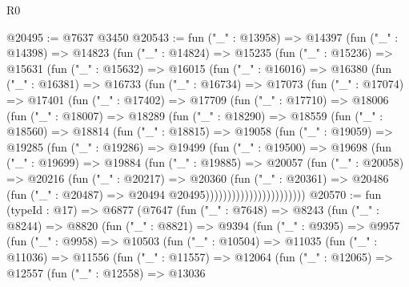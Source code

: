 \begin{lexlean}{R0}
\begin{coremodule}
@20495 := @7637 @3450
@20543 := fun ("_" : @13958) =>
  @14397
    (fun ("_" : @14398) =>
    @14823
      (fun ("_" : @14824) =>
      @15235
        (fun ("_" : @15236) =>
        @15631
          (fun ("_" : @15632) =>
          @16015
            (fun ("_" : @16016) =>
            @16380
              (fun ("_" : @16381) =>
              @16733
                (fun ("_" : @16734) =>
                @17073
                  (fun ("_" : @17074) =>
                  @17401
                    (fun ("_" : @17402) =>
                    @17709
                      (fun ("_" : @17710) =>
                      @18006
                        (fun ("_" : @18007) =>
                        @18289
                          (fun ("_" : @18290) =>
                          @18559
                            (fun ("_" : @18560) =>
                            @18814
                              (fun ("_" : @18815) =>
                              @19058
                                (fun ("_" : @19059) =>
                                @19285
                                  (fun ("_" : @19286) =>
                                  @19499
                                    (fun ("_" : @19500) =>
                                    @19698
                                      (fun ("_" : @19699) =>
                                      @19884
                                        (fun ("_" : @19885) =>
                                        @20057
                                          (fun ("_" : @20058) =>
                                          @20216
                                            (fun ("_" : @20217) =>
                                            @20360
                                              (fun ("_" : @20361) =>
                                              @20486
                                                (fun ("_" : @20487) =>
                                                @20494 @20495)))))))))))))))))))))))
@20570 := fun (typeId : @17) =>
  @6877
    (@7647
      (fun ("_" : @7648) =>
      @8243
        (fun ("_" : @8244) =>
        @8820
          (fun ("_" : @8821) =>
          @9394
            (fun ("_" : @9395) =>
            @9957
              (fun ("_" : @9958) =>
              @10503
                (fun ("_" : @10504) =>
                @11035
                  (fun ("_" : @11036) =>
                  @11556
                    (fun ("_" : @11557) =>
                    @12064
                      (fun ("_" : @12065) =>
                      @12557
                        (fun ("_" : @12558) =>
                        @13036

\end{coremodule}
\end{lexlean}
